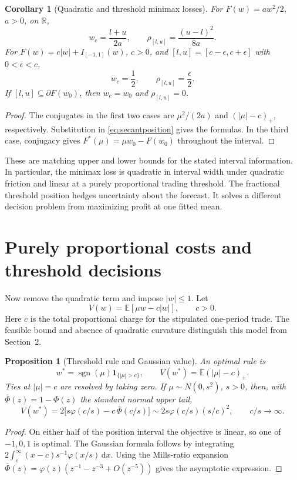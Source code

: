 \documentclass[11pt]{article}
\theoremstyle{plain}
\newtheorem{proposition}[theorem]{Proposition}
\newtheorem{corollary}[theorem]{Corollary}
\theoremstyle{definition}
\theoremstyle{remark}
\newcommand{\E}{\mathbb E}
\newcommand{\R}{\mathbb R}
\newcommand{\dd}{\,\mathrm d}
\DeclareMathOperator{\sgn}{sgn}
\begin{document}
\begin{corollary}[Quadratic and threshold minimax losses]
\label{cor:intervalradii}
For \(F(w)=aw^2/2\), \(a>0\), on \(\R\),
\[
 w_c=\frac{l+u}{2a},\qquad
 \rho_{[l,u]}=\frac{(u-l)^2}{8a}.
\]
For \(F(w)=c|w|+I_{[-1,1]}(w)\), \(c>0\), and
\([l,u]=[c-\epsilon,c+\epsilon]\) with \(0<\epsilon<c\),
\[
 w_c=\frac12,\qquad \rho_{[l,u]}=\frac{\epsilon}{2}.
\]
If \([l,u]\subseteq\partial F(w_0)\), then \(w_c=w_0\) and
\(\rho_{[l,u]}=0\).
\end{corollary}
\begin{proof}
The conjugates in the first two cases are
\(\mu^2/(2a)\) and \((|\mu|-c)_+\), respectively.
Substitution in \eqref{eq:secantposition} gives the formulas.
In the third case, conjugacy gives
\(F^*(\mu)=\mu w_0-F(w_0)\) throughout the interval.
\end{proof}

These are matching upper and lower bounds for the stated interval
information. In particular, the minimax loss is quadratic in
interval width under quadratic friction and linear at a purely
proportional trading threshold. The fractional threshold position
hedges uncertainty about the forecast. It solves a different
decision problem from maximizing profit at one fitted mean.


\section{Purely proportional costs and threshold decisions}

Now remove the quadratic term and impose \(|w|\le1\). Let
\[
V(w)=\E[\mu w-c|w|],\qquad c>0.
\]
Here \(c\) is the total proportional charge for the stipulated
one-period trade. The feasible bound and absence of quadratic curvature
distinguish this model from Section~2.

\begin{proposition}[Threshold rule and Gaussian value]\label{prop:threshold}
An optimal rule is
\[
w^\ast=\sgn(\mu)\mathbf1_{\{|\mu|>c\}},\qquad
V(w^\ast)=\E(|\mu|-c)_+.
\]
Ties at \(|\mu|=c\) are resolved by taking zero. If \(\mu\sim N(0,s^2)\),
\(s>0\), then, with \(\bar\Phi(z)=1-\Phi(z)\) the standard normal upper tail,
\begin{equation}\label{eq:gaussian}
V(w^\ast)=2\big[s\varphi(c/s)-c\,\bar\Phi(c/s)\big]
\sim2s\varphi(c/s)(s/c)^2,\qquad c/s\to\infty.
\end{equation}
\end{proposition}
\begin{proof}
On either half of the position interval the objective is linear, so
one of \(-1,0,1\) is optimal. The Gaussian formula follows by integrating
\(2\int_c^\infty(x-c)s^{-1}\varphi(x/s)\dd x\).
Using the Mills-ratio expansion
\(\bar\Phi(z)=\varphi(z)(z^{-1}-z^{-3}+O(z^{-5}))\)
gives the asymptotic expression.
\end{proof}
\end{document}

